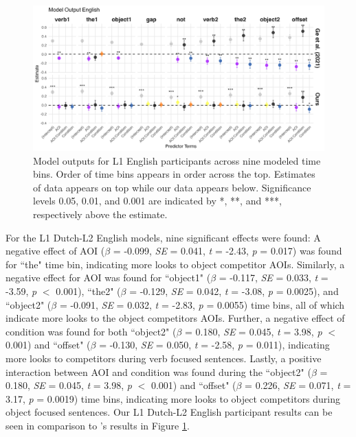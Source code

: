 \begin{figure}[H]  %
    \centering
    \includegraphics[width=\textwidth,height=\textheight,keepaspectratio]{viz/model_plot_english.png}
    \caption{Model outputs for L1 English participants across nine modeled time bins. Order of time bins appears in order across the top. Estimates of \cite{Ge2021} data appears on top while our data appears below. Significance levels 0.05, 0.01, and 0.001 are indicated by *, **, and ***, respectively above the estimate.}
    \label{fig:model_plot_english}
\end{figure}

For the L1 Dutch-L2 English models, nine significant effects were found: A negative effect of AOI ($\beta$ = -0.099, \textit{SE} = 0.041, \textit{t} = -2.43, \textit{p} = 0.017) was found for ``the" time bin, indicating more looks to object competitor AOIs. Similarly, a negative effect for AOI was found for ``object1" ($\beta$ = -0.117, \textit{SE} = 0.033, \textit{t} = -3.59, \textit{p} $<$ 0.001), ``the2" ($\beta$ = -0.129, \textit{SE} = 0.042, \textit{t} = -3.08, \textit{p} = 0.0025), and ``object2" ($\beta$ = -0.091, \textit{SE} = 0.032, \textit{t} = -2.83, \textit{p} = 0.0055) time bins, all of which indicate more looks to the object competitors AOIs. Further, a negative effect of condition was found for both ``object2" ($\beta$ = 0.180, \textit{SE} = 0.045, \textit{t} = 3.98, \textit{p} $<$ 0.001) and ``offset" ($\beta$ = -0.130, \textit{SE} = 0.050, \textit{t} = -2.58, \textit{p} = 0.011), indicating more looks to competitors during verb focused sentences. Lastly, a positive interaction between AOI and condition was found during the ``object2" ($\beta$ = 0.180, \textit{SE} = 0.045, \textit{t} = 3.98, \textit{p} $<$ 0.001) and ``offset" ($\beta$ = 0.226, \textit{SE} = 0.071, \textit{t} = 3.17, \textit{p} = 0.0019) time bins, indicating more looks to object competitors during object focused sentences. Our L1 Dutch-L2 English participant results can be seen in comparison to \cite{Ge2021}'s results in Figure \ref{fig:model_plot_english}.


